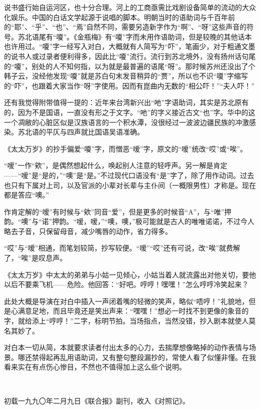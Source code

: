 \par 说书盛行始自运河区，也十分合理。河上的工商亟需比戏剧设备简单的流动的大众化娱乐。中国的白话文学起源于说唱的脚本。明朝当时的语助词与千百年前的“耶”、“乎”、“也”、“焉”自然不同，需要另造新字作为“啊”、“呀”这些声音的符号。苏北语尾有“嗄”。《金瓶梅》有“嗄”字而未用作语助词，但是较晚的其他话本也许用过。“嗄”字一经写入对白，大概就有人简写为“吓”，笔画少，对于粗通文墨的说书人或过录者便利得多，因此比“嗄”流行。流行到苏北境外，没有扬州话句尾的“嗄”，别处的人不知何指，以为就是最普遍的语尾“呀”。那时候苏州还没出了个韩子云，没经他发现“嗄”就是苏白句末发音稍异的“贾”，所以也不识“嗄”字缩写的“吓”，也跟着大家当作“呀”字使用。因而有崑曲内无数的“相公吓！”“夫人吓！”
\par 还有我觉得附带值得一提的：近年来台湾新兴出“吔”字语助词，其实是苏北原有的，因为不是国语，一直没有形之于文字。“吔”的字义接近古文“也”字。华中的这一个凋敝的心脏区似是汉族语言的一个积水潭，没很经过一波波边疆民族的冲激感染。苏北语的平仄与四声就比国语吴语准确。
\par 《太太万岁》的抄手偏爱“嗄”字，而憎恶“嗳”字，原文的“嗳”统改“哎”或“唉”。
\par “嗳”一作“欸”，是偶然想起什么，唤起别人注意的轻呼声。另一解是肯定——“嗳”是“是的，”“噢”是“是。”不过现代口语没有“是”字了，除了用作动词。过去也只有下属对上司，以及官派的小辈对长辈与主仆间（一概限男性）才称是。现在都是答应“噢。”
\par 作肯定解的“嗳”有时候与“欸”同音“爱”，但是更多的时候音“A”，与“唯”押韵。“噢”与“诺”押韵。“嗳，嗳，”“噢，噢，”极可能就是古人的唯唯诺诺，不过今人略去子音，只保留母音，减少嘴唇的动作，省力得多。
\par “哎”与“嗳”相通，而笔划较简，抄写较便。“嗳”“哎”还有可说，改“唉”就费解了，“唉”是叹息声。
\par 《太太万岁》中太太的弟弟与小姑一见倾心，小姑当着人就流露出对他关切，要他以后不要乘飞机——危险。他回答：“好吧。哼哼！嘿嘿！”怎么哼哼冷笑起来？
\par 此处大概是导演在对白中插入一声闭着嘴的轻微的笑声，略似“唔哼！”礼貌地，但是心满意足地，而且毕竟还是笑出声来：“嘿嘿！”想必一时找不到更像的象音的字，就给添上“哼哼！”二字，标明节拍。当场指点，当然没错，抄入剧本就使人莫名其妙了。
\par 对白本一切从简，本就要求读者付出太多的心力，去揣摩想像略掉的动作表情与场景。哪还禁得起再乱用语助词，又有整句整段漏抄的，常使人看了似懂非懂。在我看来实在有点伤心惨目，不然也不值得加上这么些个说明。
\par  
\par *初载一九九〇年二月九日《联合报》副刊，收入《对照记》。


